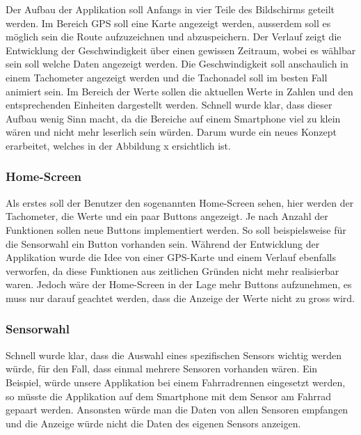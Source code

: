 
Der Aufbau der Applikation soll Anfangs in vier Teile des Bildschirms geteilt werden. 
Im Bereich GPS soll eine Karte angezeigt werden, ausserdem soll es möglich sein die Route aufzuzeichnen und abzuspeichern.
Der Verlauf zeigt die Entwicklung der Geschwindigkeit über einen gewissen Zeitraum, wobei es wählbar sein soll welche Daten angezeigt werden.
Die Geschwindigkeit soll anschaulich in einem Tachometer angezeigt werden und die Tachonadel soll im besten Fall animiert sein.
Im Bereich der Werte sollen die aktuellen Werte in Zahlen und den entsprechenden Einheiten dargestellt werden.
Schnell wurde klar, dass dieser Aufbau wenig Sinn macht, da die Bereiche auf einem Smartphone viel zu klein wären und nicht mehr leserlich sein würden. Darum wurde ein neues Konzept erarbeitet, welches in der Abbildung x ersichtlich ist.

\subsubsection{Home-Screen}

Als erstes soll der Benutzer den sogenannten Home-Screen sehen, hier werden der Tachometer, die Werte und ein paar Buttons angezeigt. Je nach Anzahl der Funktionen sollen neue Buttons implementiert werden. So soll beispielsweise für die Sensorwahl ein Button vorhanden sein. Während der Entwicklung der Applikation wurde die Idee von einer GPS-Karte und einem Verlauf ebenfalls verworfen, da diese Funktionen aus zeitlichen Gründen nicht mehr realisierbar waren. Jedoch wäre der Home-Screen in der Lage mehr Buttons aufzunehmen, es muss nur darauf geachtet werden, dass die Anzeige der Werte nicht zu gross wird.

\subsubsection{Sensorwahl}

Schnell wurde klar, dass die Auswahl eines spezifischen Sensors wichtig werden würde, für den Fall, dass einmal mehrere Sensoren vorhanden wären. Ein Beispiel, würde unsere Applikation bei einem Fahrradrennen eingesetzt werden, so müsste die Applikation auf dem Smartphone mit dem Sensor am Fahrrad gepaart werden. Ansonsten würde man die Daten von allen Sensoren empfangen und die Anzeige würde nicht die Daten des eigenen Sensors anzeigen.

